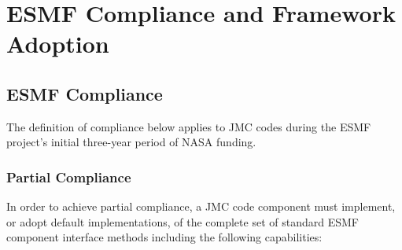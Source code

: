 \section{ESMF Compliance and Framework Adoption}
\label{sec:implications}

\subsection{ESMF Compliance}

The definition of compliance below applies to JMC codes during the
ESMF project's initial three-year period of NASA funding.

\subsubsection{Partial Compliance}
In order to achieve partial compliance, a JMC code component must 
implement, or adopt default implementations, of the complete set of 
standard ESMF component interface methods including the following
capabilities:

